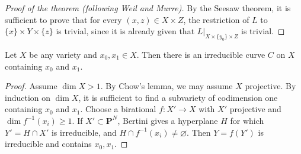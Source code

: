 
\begin{proof}[Proof of the theorem (following Weil and Murre)]
\label{mumford-proof-theorem-of-the-cube}
By the Seesaw theorem, it is sufficient to prove that for every
$(x,z)\in X\times Z$, the restriction of $L$ to
$\{x\}\times Y\times\{z\}$ is trivial, since it is already given that
$L|_{X\times\{y_0\}\times Z}$ is trivial.
\end{proof}

\begin{lemma}
\label{mumford-lem-cube-curve-joining}
Let $X$ be any variety and $x_0,x_1\in X$. Then there is an irreducible
curve $C$ on $X$ containing $x_0$ and $x_1$.
\end{lemma}
\begin{proof}
Assume $\dim X>1$. By Chow's lemma, we may assume $X$ projective. By induction
on $\dim X$, it is sufficient to find a subvariety of codimension one
containing $x_0$ and $x_1$. Choose a birational $f:X'\to X$ with $X'$ projective
and $\dim f^{-1}(x_i)\ge1$. If $X'\subset\mathbf P^N$, Bertini gives a
hyperplane $H$ for which $Y'=H\cap X'$ is irreducible, and
$H\cap f^{-1}(x_i)\ne\varnothing$. Then $Y=f(Y')$ is irreducible and contains
$x_0,x_1$.
\end{proof}

